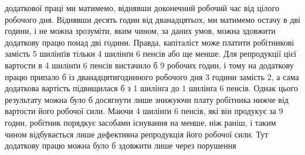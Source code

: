 додаткової праці ми матимемо, віднявши доконечний робочий
час від цілого робочого дня. Віднявши десять годин від дванадцятьох,
ми матимемо остачу в дві години, і не можна зрозуміти,
яким чином, за даних умов, можна здовжити додаткову
працю понад дві години. Правда, капіталіст може платити робітникові
замість 5 шилінґів тільки 4 шилінґи 6 пенсів або ще менше.
Для репродукції цієї вартости в 4 шилінґи 6 пенсів вистачило б
9 робочих годин, і тому на додаткову працю припало б із дванадцятигодинного
робочого дня 3 години замість 2, а сама додаткова
вартість підвищилася б з 1 шилінґа до 1 шилінґа 6 пенсів. Однак
цього результату можна було б досягнути лише знижуючи плату
робітника нижче від вартости його робочої сили. Маючи 4 шилінґи
6 пенсів, які він продукує за 9 годин, робітник порядкує
засобами існування на  менше, ніж раніш, і таким чином відбувається
лише дефективна репродукція його робочої сили. Тут
додаткову працю можна було б здовжити лише через порушення
\parbreak{}  %
